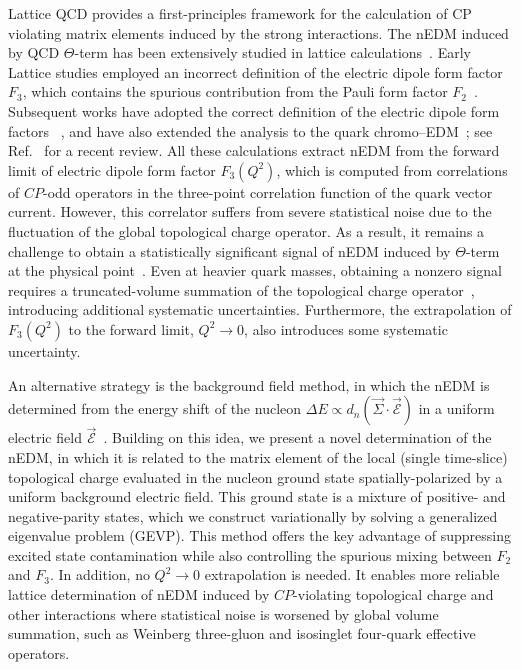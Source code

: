 \documentclass[aps,prl,twocolumn,superscriptaddress,nofootinbib]{revtex4-2}
\newcommand{\CP}{{CP}}
\newcommand{\mcE}{{\mathcal E}}
\begin{document}
Lattice QCD provides a first-principles framework for the calculation of CP violating matrix elements induced by the
strong interactions. 
The nEDM induced by QCD $\Theta$-term has been extensively studied in lattice
calculations~\cite{Shintani:2005xg,Berruto:2005hg,Shindler:2014oha,Guo:2015tla,Shindler:2015aqa,Alexandrou:2015spa,Shintani:2015vsx}.
Early Lattice studies employed an incorrect definition of the electric dipole form factor $F_3$, which contains the
spurious contribution from the Pauli form factor $F_2$~\cite{Abramczyk:2017oxr}.
Subsequent works have adopted the correct definition of the electric dipole form factors
~\cite{Dragos:2019oxn,Alexandrou:2020mds,Bhattacharya:2021lol,Liang:2023jfj}, and have also extended the analysis to the
quark chromo–EDM~\cite{Abramczyk:2017oxr,Kim:2018rce,Bhattacharya:2023qwf}; see Ref.~\cite{Liu:2024kqy} for a recent
review.
All these calculations extract nEDM from the forward limit of electric dipole form factor $F_3(Q^2)$, which is computed
from correlations of $\CP$-odd operators in the three-point correlation function of the quark vector current.
However, this correlator suffers from severe statistical noise due to the fluctuation of the global topological charge
operator.
As a result, it remains a challenge to obtain a statistically significant signal of  nEDM induced by $\Theta$-term at the
physical point~\cite{Alexandrou:2020mds,Bhattacharya:2021lol}. 
Even at  heavier quark masses, obtaining a nonzero signal requires a truncated-volume summation of the topological
charge operator~\cite{Dragos:2019oxn,Liang:2023jfj}, introducing additional systematic uncertainties.
Furthermore, the extrapolation of $F_3(Q^2)$ to the forward limit, $Q^2\to0$, also introduces some systematic
uncertainty.

An alternative strategy is the background field method, in which the nEDM is determined from the energy shift of the nucleon $\Delta E\propto d_n(\vec \Sigma\cdot\vec\mcE)$ in a uniform electric field $\vec\mcE$~\cite{Aoki:1989rx,Shintani:2006xr, Shintani:2008nt,Izubuchi:2007rmy,Abramczyk:2017oxr,Izubuchi:2020ngl,He:2023gwp}.
Building on this idea, we present a novel determination of the nEDM, in which
it is related to the matrix element of the local (single time-slice) topological charge evaluated in the nucleon ground state spatially-polarized by a uniform background electric field.
This ground state is a mixture of positive- and negative-parity states, which we construct variationally by solving a
generalized eigenvalue problem (GEVP).
This method offers the key advantage of suppressing excited state contamination 
while also controlling the spurious mixing between $F_2$ and $F_3$.
In addition, no $Q^2\to0$ extrapolation is needed.
It enables more reliable lattice determination of nEDM induced by $\CP$-violating topological charge and other interactions where statistical noise is worsened by global volume summation, such as Weinberg three-gluon and isosinglet four-quark effective operators.
\end{document}
